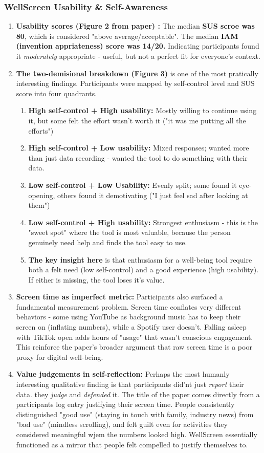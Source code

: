 \documentclass[12pt]{article}
\begin{document}
\subsubsection{WellScreen Usability \& Self-Awareness}
\begin{enumerate}
    \item \textbf{Usability scores (Figure 2 from paper) : } The median \textbf{SUS scroe was 80}, which is considered "above average/acceptable". The median \textbf{IAM (invention appriateness) score was 14/20. } Indicating participants found it \textit{moderately} appropriate - useful, but not a perfect fit for everyone's context.
    \item  \textbf{The two-demisional breakdown (Figure 3)} is one of the most pratically interesting findings. Participants were mapped by self-control level and SUS score into four quadrants.
    \begin{enumerate}
        \item \textbf{High self-control + High usability:} Mostly willing to continue using it, but some felt the effort wasn't worth it ("it was me putting all the efforts")
        \item \textbf{High self-control + Low usability: } Mixed responses; wanted more than just data recording - wanted the tool to do something with their data.
        \item \textbf{Low self-control + Low Usability: } Evenly split; some found it eye-opening, others found it demotivating ("I just feel sad after looking at them")
        \item \textbf{Low self-control + High usability:} Strongest enthusiasm - this is the "sweet spot" where the  tool is most valuable, because the person genuinely need help and finds the tool easy to use. 
        \item \textbf{The key insight here} is that enthusiasm for a well-being tool require both a felt need (low self-control) and a good experience (high usability). If either is missing, the tool loses it's value.
    \end{enumerate}
    \item \textbf{Screen time as imperfect metric: } Participants also surfaced a fundamental measurement problem. Screen time conflates very different behaviors - some using YouTube as background music has to keep their screen on (inflating numbers), while a Spotify user doesn't. Falling asleep with TikTok open adds hours of "usage" that  wasn't conscious engagement. This reinforce the paper's broader argument that raw screen time is a poor proxy for digital well-being.
    \item \textbf{Value judgements in self-reflection: } Perhaps the most humanly interesting qualitative finding is that participants did'nt just \textit{report} their data. they \textit{judge} and \textit{defended} it. The title of the paper comes directly from a participants log entry justifying their screen time. People consistently distinguished "good use" (staying in touch with family, industry news) from "bad use" (mindless scrolling), and felt guilt even for activities they considered meaningful wjem the numbers looked high. WellScreen essentially functioned as a mirror that people felt compelled to justify themselves to.
\end{enumerate}
\end{document}
